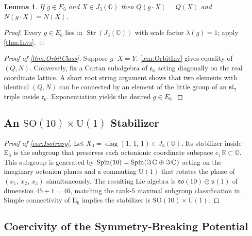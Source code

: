 \documentclass[pdflatex,sn-mathphys-num]{sn-jnl}
\theoremstyle{thmstyleone}
\newtheorem{lemma}[lemma]{Lemma}
\theoremstyle{thmstyletwo}%
\theoremstyle{thmstylethree}%
\newcommand{\SO}[1]{\mathrm{SO(#1)}}
\newcommand{\U}[1]{\mathrm{U(#1)}}
\newcommand{\E}[1]{\mathrm{E_{#1}}}
\newcommand{\Oct}{\mathbb{O}}
\newcommand{\jalg}{J_3(\mathbb{O})}
\newcommand{\SOTen}{\SO{10}}
\newcommand{\UOne}{\U{1}}
\newcommand{\ESix}{\E{6}}
\newcommand{\SOTenXUOne}{\SOTen \times \UOne}
\newcommand{\s}{\hspace{.1em}}
\newcommand{\Str}{\operatorname{Str}}
\newcommand{\Spin}{\operatorname{Spin}}
\begin{document}
\begin{appendices}
\begin{lemma}\label{lem:OrbitInv}
If $g\in E_{6}$ and $X\in\jalg$ then
$Q(g\cdot X)=Q(X)$ and $N(g\cdot X)=N(X)$.
\end{lemma}

\begin{proof}
Every $g\in E_{6}$ lies in $\Str(\jalg)$ with scale factor $\lambda(g)=1$; apply \autoref{thm:Invs}.
\end{proof}

\begin{proof}[Proof of \autoref{thm:OrbitClass}]
Suppose $g \cdot X=Y$.  \autoref{lem:OrbitInv} gives equality of $(Q,N)$.  
Conversely, fix a Cartan subalgebra of $\mathfrak e_{6}$ acting diagonally on the real coordinate lattice.  A short root string argument \cite{Springer:2000} shows that two elements with identical $(Q,N)$ can be connected by an element of the little group of an $\mathfrak{sl}_{2}$ triple inside $\mathfrak e_{6}$.  Exponentiation yields the desired $g\in E_{6}$.
\end{proof}

\subsection{An \texorpdfstring{$\SOTenXUOne$}{SO(10) × U(1)} Stabilizer}
\label{app:Albert:Isotropy}

\begin{proof}[Proof of \autoref{cor:Isotropy}]
Let $X_{0}=\operatorname{diag}(1,\,1,\,1)\in\jalg$.  
Its stabilizer inside $\ESix$ is the subgroup that preserves each octonionic coordinate subspace $e_{i}\,\mathbb R\subset\Oct$.  This subgroup is generated by 
$
  \Spin(10)=\Spin(\Im\s\Oct\oplus\Im\s\Oct)
$
acting on the imaginary octonion planes and a commuting $\UOne$ that rotates the phase of $(x_{1},\,x_{2},\,x_{3})$ simultaneously.  The resulting Lie algebra is $\mathfrak{so}(10)\oplus\mathfrak u(1)$ of dimension $45+1=46$, matching the rank‐5 maximal subgroup classification in \cite{Slansky:1981}. Simple connectivity of $\ESix$ implies the stabilizer is $\SOTenXUOne$.
\end{proof}

\subsection{Coercivity of the Symmetry‐Breaking Potential}
\label{app:Albert:Coercive}


\end{appendices}
\end{document}
